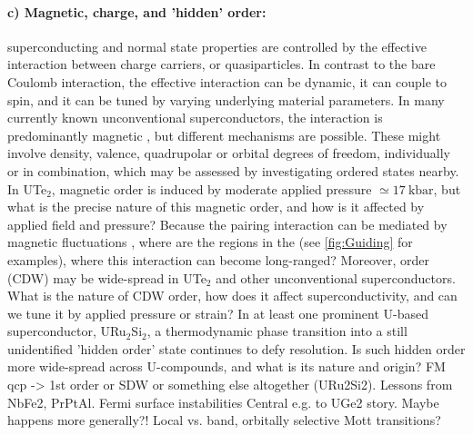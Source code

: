 \paragraph{c) Magnetic, charge, and 'hidden' order:} superconducting and normal state properties are controlled by the effective interaction between charge carriers, or quasiparticles. In contrast to the bare Coulomb interaction, the effective interaction can be dynamic, it can couple to spin, and it can be tuned by varying underlying material parameters. In many currently known unconventional superconductors, the interaction is predominantly magnetic \cite{monthoux07}, but different mechanisms are possible. These might involve density, valence, quadrupolar or orbital degrees of freedom, individually or in combination, which may be assessed by investigating ordered states nearby. In UTe$_2$, magnetic order is induced by moderate applied pressure $\simeq \SI{17}{\kilo\bar}$, but what is the precise nature of this magnetic order, and how is it affected by applied field and pressure? Because the pairing interaction can be mediated by magnetic fluctuations \cite{monthoux07}, where are the regions in the  (see \autoref{fig:Guiding} for examples), where this interaction can become long-ranged? Moreover,  order (CDW) may be wide-spread in UTe$_2$ and other unconventional superconductors. What is the nature of CDW order, how does it affect superconductivity, and can we tune it by applied pressure or strain? In at least one prominent U-based superconductor, URu$_2$Si$_2$, a thermodynamic phase transition into a still unidentified 'hidden order' state continues to defy resolution. Is such hidden order more wide-spread across U-compounds, and what is its nature and origin?
FM qcp -> 1st order or SDW or something else altogether (URu2Si2). 
Lessons from NbFe2, PrPtAl. Fermi surface instabilities
Central e.g. to UGe2 story. Maybe happens more generally?! Local vs. band, orbitally selective Mott transitions? 










